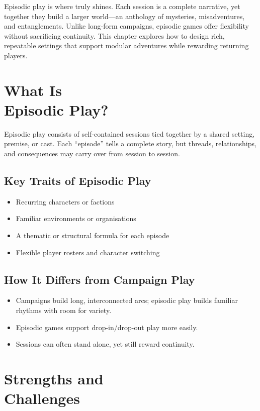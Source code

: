 
Episodic play is where \wyrd truly shines. Each session is a complete narrative, yet together they build a larger world—an anthology of mysteries, misadventures, and entanglements. Unlike long-form campaigns, episodic games offer flexibility without sacrificing continuity. This chapter explores how to design rich, repeatable settings that support modular adventures while rewarding returning players.

\section[What Is Episodic Play?]{What Is\\ Episodic Play?}

Episodic play consists of self-contained sessions tied together by a shared setting, premise, or cast. Each “episode” tells a complete story, but threads, relationships, and consequences may carry over from session to session.

\subsection*{Key Traits of Episodic Play}
\begin{itemize}
    \item Recurring characters or factions
    \item Familiar environments or organisations
    \item A thematic or structural formula for each episode
    \item Flexible player rosters and character switching
\end{itemize}

\subsection*{How It Differs from Campaign Play}
\begin{itemize}
    \item Campaigns build long, interconnected arcs; episodic play builds familiar rhythms with room for variety.
    \item Episodic games support drop-in/drop-out play more easily.
    \item Sessions can often stand alone, yet still reward continuity.
\end{itemize}

\section[Strengths and Challenges]{Strengths and\\ Challenges}

